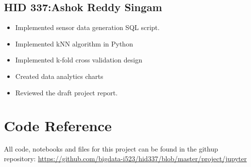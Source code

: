 \documentclass[sigconf]{acmart}
\begin{document}
\subsection{HID 337:Ashok Reddy Singam}
\begin{itemize}
  \item Implemented sensor data generation SQL script.
  \item Implemented kNN algorithm in Python
  \item Implemented k-fold cross validation design
  \item Created data analytics charts
  \item Reviewed the draft project report.
\end{itemize}

\section{Code Reference}
All code, notebooks and files for this project can be found in the githup repository:
\url{https://github.com/bigdata-i523/hid337/blob/master/project/jupyter}
\end{document}
